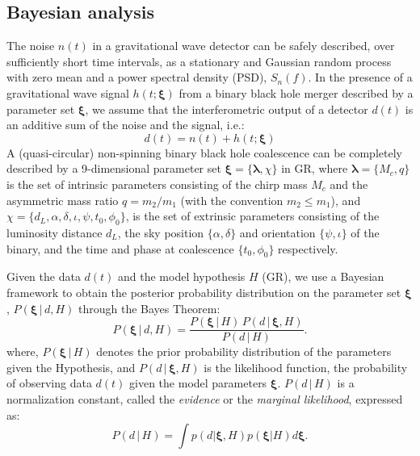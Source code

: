 \documentclass[prd,preprintnumbers,twocolumn,eqsecnum,floatfix,a4paper,nofootinbib,superscriptaddress]{revtex4}
\newcommand{\blambda}{\bm{\lambda}}
\newcommand{\bxi}{\bm{\xi}}
\begin{document}
\subsection{Bayesian analysis}\label{ssec:bayesian_analsysis}

The noise $n(t)$ in a gravitational wave detector can be safely described, over sufficiently short time intervals, as a stationary and Gaussian random process with zero mean and a power spectral density (PSD), $S_n(f)$. In the presence of a gravitational wave signal $h(t; \bxi)$ from a binary black hole merger described by a parameter set $\bxi$, we assume that the interferometric output of a detector $d(t)$ is an additive sum of the noise and the signal, i.e.:
\begin{equation}
d(t) = n(t) + h(t; \bxi)
\end{equation}
A (quasi-circular) non-spinning binary black hole coalescence can be completely described by a 9-dimensional parameter set $\bxi = \{ \blambda, \chi \}$ in GR, where $\blambda = \{ M_c, q \}$ is the set of intrinsic parameters consisting of the chirp mass $M_c$ and the asymmetric mass ratio $q = m_2/m_1$ (with the convention $m_2 \leq m_1$), and $\chi = \{ d_L, \alpha, \delta, \iota, \psi, t_0, \phi_0 \}$, is the set of extrinsic parameters consisting of the luminosity distance $d_L$, the sky position $\{\alpha, \delta\}$ and orientation $\{\psi, \iota\}$ of the binary, and the time and phase at coalescence $\{t_0, \phi_0\}$ respectively.

Given the data $d(t)$ and the model hypothesis $H$ (GR), we use a Bayesian framework to obtain the posterior probability distribution on the parameter set $\bxi$, $P({\bxi} \, | \, d, H)$ through the Bayes Theorem:
\begin{equation}
P({\bxi} \, | \, d, H) = \frac{P({\bxi} \, | \, H) \, P (d \, | \, {\bxi}, H)}{P(d \, | \, H)}.
\label{eq:Bayes_theorem}
\end{equation} 
where, $P({\bxi} \, | \, H)$ denotes the prior probability distribution of the parameters given the Hypothesis, and $P (d \, | \, {\bxi}, H)$ is the likelihood function, the probability of observing data $d(t)$ given the model parameters $\bxi$. $P(d \, | \, H)$ is a normalization constant, called the \emph{evidence} or the \emph{marginal likelihood}, expressed as:
 \begin{equation}
 P(d \, | \, H)=\int p(d|\bxi, H)p(\bxi | H)d\bxi.
 \label{eq:evidence}
 \end{equation}
\end{document}
